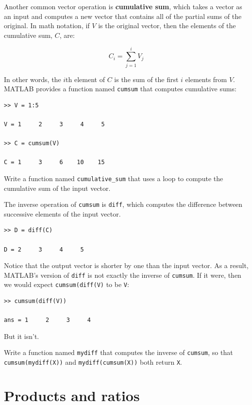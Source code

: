 \documentclass[
]{book}
\begin{document}
Another common vector operation is {\bf cumulative sum}, which takes a
vector as an input and computes a new vector that contains all of the
partial sums of the original.  In math notation, if $V$ is the
original vector, then the elements of the cumulative sum, $C$, are:

\begin{equation}
C_i = \sum_{j=1}^i V_j
\end{equation}

In other words, the $i$th element of $C$ is the sum of the first
$i$ elements from $V$.  MATLAB provides a function named {\tt cumsum}
that computes cumulative sums:

\begin{verbatim}
>> V = 1:5

V = 1     2     3     4     5

>> C = cumsum(V)

C = 1     3     6    10    15
\end{verbatim}

\begin{ex}
Write a function named {\tt cumulative\_sum} that uses
a loop to compute the cumulative sum of the input vector.
\end{ex}

The inverse operation of {\tt cumsum} is {\tt diff}, which computes
the difference between successive elements of the input vector.

\begin{verbatim}
>> D = diff(C)

D = 2     3     4     5
\end{verbatim}

Notice that the output vector is shorter by one than the input
vector.  As a result, MATLAB's version of {\tt diff} is not
exactly the inverse of {\tt cumsum}.  If it were, then we would
expect {\tt cumsum(diff(V)} to be {\tt V}:

\begin{verbatim}
>> cumsum(diff(V))

ans = 1     2     3     4
\end{verbatim}

But it isn't.

\begin{ex}
Write a function named {\tt mydiff} that computes the
inverse of {\tt cumsum}, so that {\tt cumsum(mydiff(X))} and
{\tt mydiff(cumsum(X))} both
return {\tt X}.
\end{ex}


\section{Products and ratios}
\end{document}

